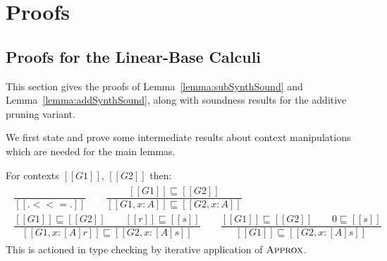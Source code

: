 \chapter{Proofs}
\label{appendix:proofs}
\section{Proofs for the Linear-Base Calculi}
\label{sec:linear-proofs}
This section gives the proofs of Lemma~\ref{lemma:subSynthSound} and
Lemma~\ref{lemma:addSynthSound}, along with soundness results for the
additive pruning variant.

We first state and prove some intermediate results about context manipulations
which are needed for the main lemmas.

\begin{definition}
For contexts $[[ G1 ]]$, $[[ G2 ]]$ then:
%
\begin{align*}
\begin{array}{c}
\dfrac{}{[[ . <<= . ]]}
\qquad
\dfrac{[[ G1 ]] \sqsubseteq [[ G2 ]]}
      {[[ G1, x : A ]] \sqsubseteq [[ G2, x : A ]]}
\qquad \\[1.5em]
\dfrac{[[ G1 ]] \sqsubseteq [[ G2 ]] \qquad [[ r ]] \sqsubseteq [[ s ]]}
      {[[ G1, x : [A] r ]] \sqsubseteq [[ G2, x : [A] s ]]}
\qquad
\dfrac{ [[ G1 ]] \sqsubseteq [[ G2 ]] \qquad 0 \sqsubseteq [[ s ]]}
      { [[ G1 ]] \sqsubseteq [[  {G2, x : [A] s} ]]}
\end{array}
\end{align*}
%
This is actioned in type checking by iterative application of $\textsc{Approx}$.
\end{definition}


